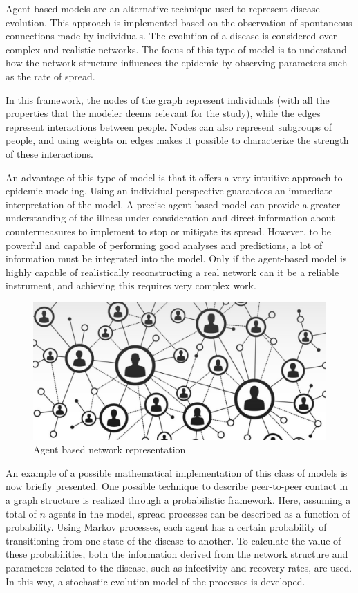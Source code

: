 Agent-based models are an alternative technique used to represent disease evolution. This approach is implemented based on the observation of spontaneous connections made by individuals. The evolution of a disease is considered over complex and realistic networks. The focus of this type of model is to understand how the network structure influences the epidemic by observing parameters such as the rate of spread.

In this framework, the nodes of the graph represent individuals (with all the properties that the modeler deems relevant for the study), while the edges represent interactions between people. Nodes can also represent subgroups of people, and using weights on edges makes it possible to characterize the strength of these interactions.

An advantage of this type of model is that it offers a very intuitive approach to epidemic modeling. Using an individual perspective guarantees an immediate interpretation of the model. A precise agent-based model can provide a greater understanding of the illness under consideration and direct information about countermeasures to implement to stop or mitigate its spread. However, to be powerful and capable of performing good analyses and predictions, a lot of information must be integrated into the model. Only if the agent-based model is highly capable of realistically reconstructing a real network can it be a reliable instrument, and achieving this requires very complex work.
\begin{figure}
	\centering
	\includegraphics[width=0.5\linewidth]{0_introduction/images_introduction/agent_based}
	\caption[Agent based network representation]{Agent based network representation}
	\label{fig:agentbased}
\end{figure}


An example of a possible mathematical implementation of this class of models is now briefly presented. One possible technique to describe peer-to-peer contact in a graph structure is realized through a probabilistic framework. Here, assuming a total of $n$ agents in the model, spread processes can be described as a function of probability. Using Markov processes, each agent has a certain probability of transitioning from one state of the disease to another. To calculate the value of these probabilities, both the information derived from the network structure and parameters related to the disease, such as infectivity and recovery rates, are used. In this way, a stochastic evolution model of the processes is developed.

